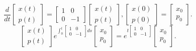 \documentclass[../main.tex]{subfiles}
\begin{document}
    \begin{przyklad}
        \[
            \frac{d}{dt}\begin{bmatrix} x(t)\\p(t) \end{bmatrix}  = \begin{bmatrix} 1&0\\0&-1 \end{bmatrix} \begin{bmatrix} x(t)\\p(t) \end{bmatrix} , \begin{bmatrix} x(0)\\p(0) \end{bmatrix} = \begin{bmatrix} x_0\\p_0 \end{bmatrix}
        .\]
        \[
            \begin{bmatrix} x(t)\\p(t) \end{bmatrix} e^{\int_{0}^t \begin{bmatrix} 1&0\\0&-1 \end{bmatrix} ds}\begin{bmatrix} x_0\\p_0 \end{bmatrix} = e^{t\begin{bmatrix} 1&0\\0&-1 \end{bmatrix} }\begin{bmatrix} x_0\\p_0 \end{bmatrix}
        .\]
    \end{przyklad}
\end{document}

